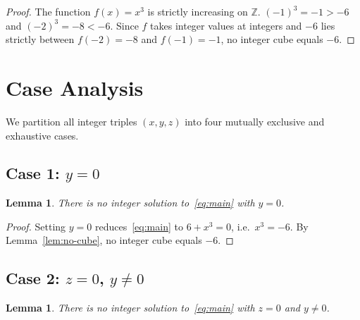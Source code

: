 \documentclass[12pt,a4paper]{article}
\newtheorem{lemma}[theorem]{Lemma}
\theoremstyle{definition}
\newcommand{\Z}{\mathbb{Z}}
\begin{document}
\begin{proof}
  The function $f(x) = x^3$ is strictly increasing on $\Z$.
  $(-1)^3 = -1 > -6$ and $(-2)^3 = -8 < -6$.
  Since $f$ takes integer values at integers and $-6$ lies strictly
  between $f(-2) = -8$ and $f(-1) = -1$, no integer cube equals $-6$.
\end{proof}

\section{Case Analysis}

We partition all integer triples $(x,y,z)$ into four mutually exclusive and
exhaustive cases.

\subsection{Case 1: \texorpdfstring{$y = 0$}{y = 0}}

\begin{lemma}\label{lem:case1}
  There is no integer solution to~\eqref{eq:main} with $y = 0$.
\end{lemma}

\begin{proof}
  Setting $y = 0$ reduces~\eqref{eq:main} to $6 + x^3 = 0$,
  i.e.\ $x^3 = -6$.
  By Lemma~\ref{lem:no-cube}, no integer cube equals $-6$.
\end{proof}

\subsection{Case 2: \texorpdfstring{$z = 0$, $y \neq 0$}{z = 0, y ≠ 0}}

\begin{lemma}\label{lem:case2}
  There is no integer solution to~\eqref{eq:main} with $z = 0$ and $y \neq 0$.
\end{lemma}
\end{document}
